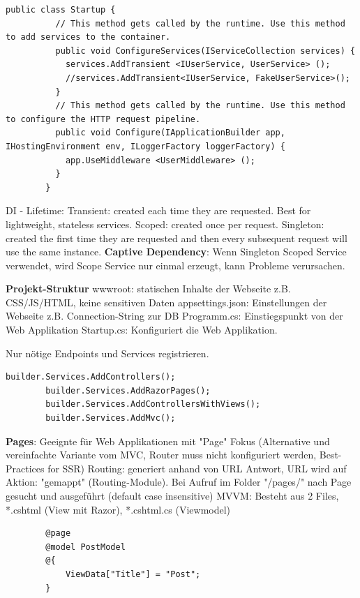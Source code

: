 \documentclass[10pt,landscape]{article}
\begin{document}
\begin{multicols}{2}
        \begin{lstlisting}[style=CSharp]
        public class Startup {
          // This method gets called by the runtime. Use this method to add services to the container.
          public void ConfigureServices(IServiceCollection services) {
            services.AddTransient <IUserService, UserService> ();
            //services.AddTransient<IUserService, FakeUserService>();
          }
          // This method gets called by the runtime. Use this method to configure the HTTP request pipeline.
          public void Configure(IApplicationBuilder app, IHostingEnvironment env, ILoggerFactory loggerFactory) {
            app.UseMiddleware <UserMiddleware> ();
          }
        }
        \end{lstlisting}

        DI - Lifetime: Transient: created each time they are requested. Best for lightweight, stateless services. Scoped: created once per request. Singleton: created the first time they are requested and then every subsequent request will use the same instance.
        \textbf{Captive Dependency}: Wenn Singleton Scoped Service verwendet, wird Scope Service nur einmal erzeugt, kann Probleme verursachen.

        \textbf{Projekt-Struktur}
        wwwroot: statischen Inhalte der Webseite z.B. CSS/JS/HTML, keine sensitiven Daten
        appsettings.json: Einstellungen der Webseite z.B. Connection-String zur DB
        Programm.cs: Einstiegspunkt von der Web Applikation
        Startup.cs: Konfiguriert die Web Applikation.

        Nur nötige Endpoints und Services registrieren.

        \begin{lstlisting}[style=CSharp]
        builder.Services.AddControllers();
        builder.Services.AddRazorPages();
        builder.Services.AddControllersWithViews();
        builder.Services.AddMvc();
        \end{lstlisting}

        \textbf{Pages}: Geeignte für Web Applikationen mit "Page" Fokus (Alternative und vereinfachte Variante vom MVC, Router muss nicht konfiguriert werden, Best-Practices for SSR)
        Routing: generiert anhand von URL Antwort, URL wird auf Aktion: "gemappt" (Routing-Module). Bei Aufruf im Folder "/pages/" nach Page gesucht und ausgeführt (default case insensitive)
        MVVM: Besteht aus 2 Files, *.cshtml (View mit Razor), *.cshtml.cs (Viewmodel)
        \begin{lstlisting}
        @page
        @model PostModel
        @{
            ViewData["Title"] = "Post";
        }


\end{lstlisting}
\end{multicols}
\end{document}
